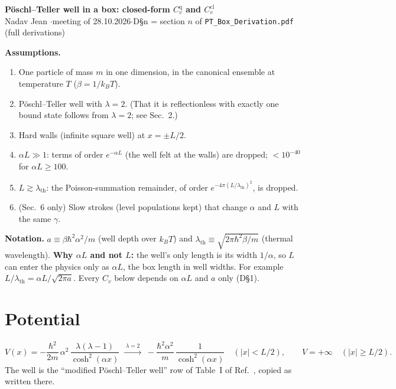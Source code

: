 \documentclass[10pt]{article}
\newcommand{\lth}{\lambda_{\mathrm{th}}}
\newcommand{\Cq}{C_v^{\mathrm{q}}}
\newcommand{\Ccl}{C_v^{\mathrm{cl}}}
\newcommand{\kB}{k_{B}}
\newcommand{\D}[1]{\textsf{D\S#1}}
\begin{document}
\begin{center}
{\large\bfseries P\"oschl--Teller well in a box: closed-form $\Cq$ and $\Ccl$}\\[1mm]
{\small Nadav Jean \quad$\cdot$\quad meeting of 28.10.2026\quad$\cdot$\quad \D{n} = section $n$ of \texttt{PT\_Box\_Derivation.pdf} (full derivations)}
\end{center}

\begin{keybox}
\textbf{Assumptions.}
\begin{enumerate}[label=\textbf{A\arabic*},itemsep=0pt]
\item One particle of mass $m$ in one dimension, in the canonical ensemble at temperature $T$ ($\beta=1/\kB T$).
\item P\"oschl--Teller well with $\lambda=2$. (That it is reflectionless with exactly one bound state follows from $\lambda=2$; see Sec.~2.)
\item Hard walls (infinite square well) at $x=\pm L/2$.
\item $\alpha L\gg1$: terms of order $e^{-\alpha L}$ (the well felt at the walls) are dropped; $<10^{-40}$ for $\alpha L\ge100$.
\item $L\gtrsim\lth$: the Poisson-summation remainder, of order $e^{-4\pi(L/\lth)^2}$, is dropped.
\item (Sec.~6 only) Slow strokes (level populations kept) that change $\alpha$ and $L$ with the same $\gamma$.
\end{enumerate}
\textbf{Notation.} $a\equiv\beta\hbar^2\alpha^2/m$ (well depth over $\kB T$) and $\lth\equiv\sqrt{2\pi\hbar^2\beta/m}$ (thermal wavelength).
\textbf{Why $\alpha L$ and not $L$:} the well's only length is its width $1/\alpha$, so $L$ can enter the physics only as $\alpha L$, the box length in well widths. For example $L/\lth=\alpha L/\sqrt{2\pi a}$. Every $C_v$ below depends on $\alpha L$ and $a$ only (\D{1}).
\end{keybox}

\section{Potential}
\begin{equation}
V(x)=-\frac{\hbar^2}{2m}\,\alpha^2\,\frac{\lambda(\lambda-1)}{\cosh^2(\alpha x)}\;\xrightarrow{\;\lambda=2\;}\;-\frac{\hbar^2\alpha^2}{m}\,\frac{1}{\cosh^2(\alpha x)}\quad(|x|<L/2),\qquad V=+\infty\quad(|x|\ge L/2).
\label{eq:V}
\end{equation}
The well is the ``modified P\"oschl--Teller well'' row of Table~I of Ref.~\cite[p.~021013-9]{deffner}, copied as written there.
\end{document}
